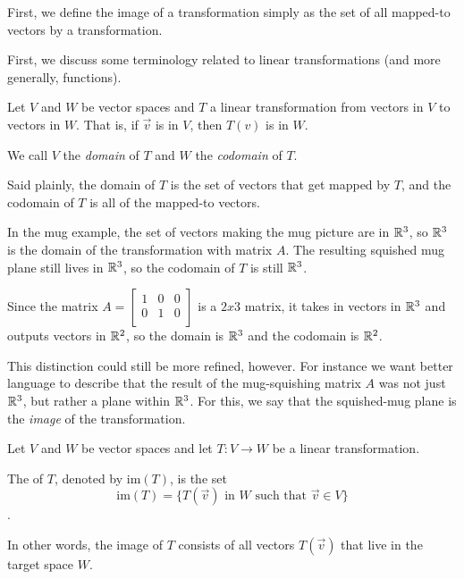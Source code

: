 \documentclass{ximera}
\begin{document}
First, we define the image of a transformation simply as the set of all mapped-to vectors by a transformation.

First, we discuss some terminology related to linear transformations (and more generally, functions). 

\begin{definition}
  Let $V$ and $W$ be vector spaces and $T$ a linear transformation from vectors in $V$ to vectors in $W$. That is, if $\vec{v}$ is in $V$, then $T(v)$ is in $W$.

  We call $V$ the \emph{domain} of $T$ and $W$ the \emph{codomain} of $T$.
\end{definition}

Said plainly, the domain of $T$ is the set of vectors that get mapped by $T$, and the codomain of $T$ is all of the mapped-to vectors. 

In the mug example, the set of vectors making the mug picture are in $\mathbb{R}^3$, so $\mathbb{R}^3$ is the domain of the transformation with matrix $A$. The resulting squished mug plane still lives in $\mathbb{R}^3$, so the codomain of $T$ is still $\mathbb{R}^3$. 

Since the matrix $A=\begin{bmatrix}
  1&0&0\\
  0&1&0\\
\end{bmatrix}$ is a $2x3$ matrix, it takes in vectors in $\mathbb{R}^3$ and outputs vectors in $\mathbb{R}^2$, so the domain is $\mathbb{R}^3$ and the codomain is $\mathbb{R}^2$.

This distinction could still be more refined, however. For instance we want better language to describe that the result of the mug-squishing matrix $A$ was not just $\mathbb{R}^3$, but rather a plane within $\mathbb{R}^3$. For this, we say that the squished-mug plane is the \emph{image} of the transformation.

\begin{definition}\label{def:imageofT}
Let $V$ and $W$ be vector spaces and let $T:V\rightarrow W$ be a linear transformation.  

The  of $T$, denoted by $\mbox{im}(T)$, is the set
$$\mbox{im}(T)=\{T(\vec{v})\text{ in }W\text{ such that }\vec{v}\in V\}$$.

In other words, the image of $T$ consists of all vectors $T(\vec{v})$ that live in the target space $W$.
\end{definition}
\end{document}
